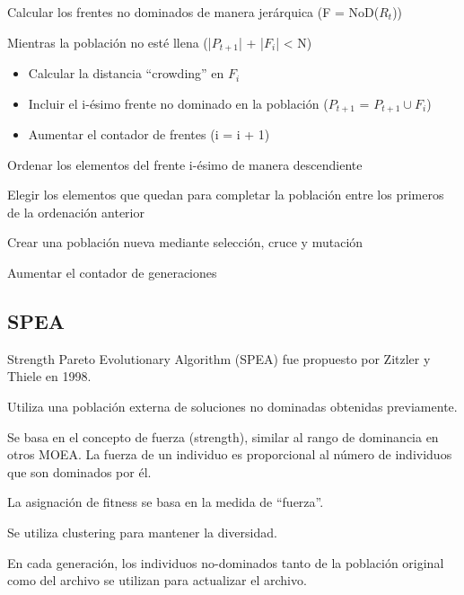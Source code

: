 \documentclass[12pt, twoside, openright]{report} %
\begin{document}
Calcular los frentes no dominados de manera jerárquica (F = NoD($R_t$))

Mientras la población no esté llena (|$P_{t+1}$| + |$F_i$| < N)
\begin{itemize}
	\item Calcular la distancia “crowding” en $F_i$
	\item Incluir el i-ésimo frente no dominado en la población ($P_{t+1}$ = $P_{t+1} \cup F_i$)
	\item Aumentar el contador de frentes (i = i + 1)
\end{itemize}

Ordenar los elementos del frente i-ésimo de manera descendiente

Elegir los elementos que quedan para completar la población entre los primeros de la ordenación anterior

Crear una población nueva mediante selección, cruce y mutación

Aumentar el contador de generaciones
\pagebreak
\subsection{SPEA}
Strength Pareto Evolutionary Algorithm (SPEA) fue propuesto por Zitzler y Thiele en 1998.

Utiliza una población externa de soluciones no dominadas obtenidas previamente.

Se basa en el concepto de fuerza (strength), similar al rango de dominancia en otros MOEA. La fuerza de un individuo es proporcional al número de individuos que son dominados por él.

La asignación de fitness se basa en la medida de “fuerza”.

Se utiliza clustering para mantener la diversidad.

En cada generación, los individuos no-dominados tanto de la población original como del archivo se utilizan para actualizar el archivo.
\end{document}
